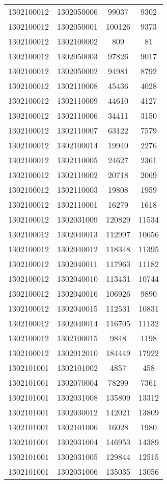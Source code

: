\begin{longtable}{llcc}
1302100012 & 1302050006 & 99037 & 9302\\
1302100012 & 1302050001 & 100126 & 9373\\
1302100012 & 1302100002 & 809 & 81\\
1302100012 & 1302050003 & 97826 & 9017\\
1302100012 & 1302050002 & 94981 & 8792\\
1302100012 & 1302110008 & 45436 & 4028\\
1302100012 & 1302110009 & 44610 & 4127\\
1302100012 & 1302110006 & 34411 & 3150\\
1302100012 & 1302110007 & 63122 & 7579\\
1302100012 & 1302100014 & 19940 & 2276\\
1302100012 & 1302110005 & 24627 & 2361\\
1302100012 & 1302110002 & 20718 & 2069\\
1302100012 & 1302110003 & 19808 & 1959\\
1302100012 & 1302110001 & 16279 & 1618\\
1302100012 & 1302031009 & 120829 & 11534\\
1302100012 & 1302040013 & 112997 & 10656\\
1302100012 & 1302040012 & 118348 & 11395\\
1302100012 & 1302040011 & 117963 & 11182\\
1302100012 & 1302040010 & 113431 & 10744\\
1302100012 & 1302040016 & 106926 & 9890\\
1302100012 & 1302040015 & 112531 & 10831\\
1302100012 & 1302040014 & 116705 & 11132\\
1302100012 & 1302100015 & 9848 & 1198\\
1302100012 & 1302012010 & 184449 & 17922\\
1302101001 & 1302101002 & 4857 & 458\\
1302101001 & 1302070004 & 78299 & 7361\\
1302101001 & 1302031008 & 135809 & 13312\\
1302101001 & 1302030012 & 142021 & 13809\\
1302101001 & 1302101006 & 16028 & 1980\\
1302101001 & 1302031004 & 146953 & 14389\\
1302101001 & 1302031005 & 129844 & 12515\\
1302101001 & 1302031006 & 135035 & 13056\\

\end{longtable}
